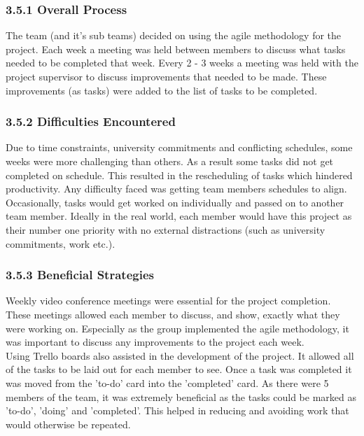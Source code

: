 \documentclass[11pt]{article}
\begin{document}
\begin{adjustwidth}{1cm}{}

\subsubsection{3.5.1 Overall Process}
The team (and it's sub teams) decided on using the agile methodology for the project. Each week a meeting was held between members to discuss what tasks needed to be completed that week. Every 2 - 3 weeks a meeting was held with the project supervisor to discuss improvements that needed to be made. These improvements (as tasks) were added to the list of tasks to be completed.

\subsubsection{3.5.2 Difficulties Encountered}
Due to time constraints, university commitments and conflicting schedules, some weeks were more challenging than others. As a result some tasks did not get completed on schedule. This resulted in the rescheduling of tasks which hindered productivity. Any difficulty faced was getting team members  schedules to align. Occasionally, tasks would get worked on individually and passed on to another team member. Ideally in the real world, each member would have this project as their number one priority with no external distractions (such as university commitments, work etc.).

\subsubsection{3.5.3 Beneficial Strategies}
Weekly video conference meetings were essential for the project completion. These meetings allowed each member to discuss, and show, exactly what they were working on. Especially as the group implemented the agile methodology, it was important to discuss any improvements to the project each week. \\

Using Trello boards also assisted in the development of the project. It allowed all of the tasks to be laid out for each member to see. Once a task was completed it was moved from the 'to-do' card into the 'completed' card. As there were 5 members of the team, it was extremely beneficial as the tasks could be marked as 'to-do', 'doing' and 'completed'. This helped in reducing and avoiding work that would otherwise be repeated.

\end{adjustwidth}
\end{document}
